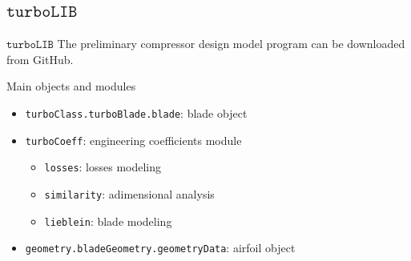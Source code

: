 \subsection{$\mathtt{turboLIB}$}
	\begin{frame}[fragile]{$\mathtt{turboLIB}$}
		The preliminary compressor design model program \href{https://github.com/antoniopucciarelli/turboLIB}{} can be downloaded from GitHub.
		\begin{block}{Main objects and modules}
			\begin{itemize}
				\item \verb|turboClass.turboBlade.blade|: blade object
				\item \verb|turboCoeff|: engineering coefficients module
					\begin{itemize}
						\item \verb|losses|: losses modeling 
						\item \verb|similarity|: adimensional analysis
						\item \verb|lieblein|: blade modeling
					\end{itemize}
				\item \verb|geometry.bladeGeometry.geometryData|: airfoil object
			\end{itemize}
		\end{block}
	\end{frame}
